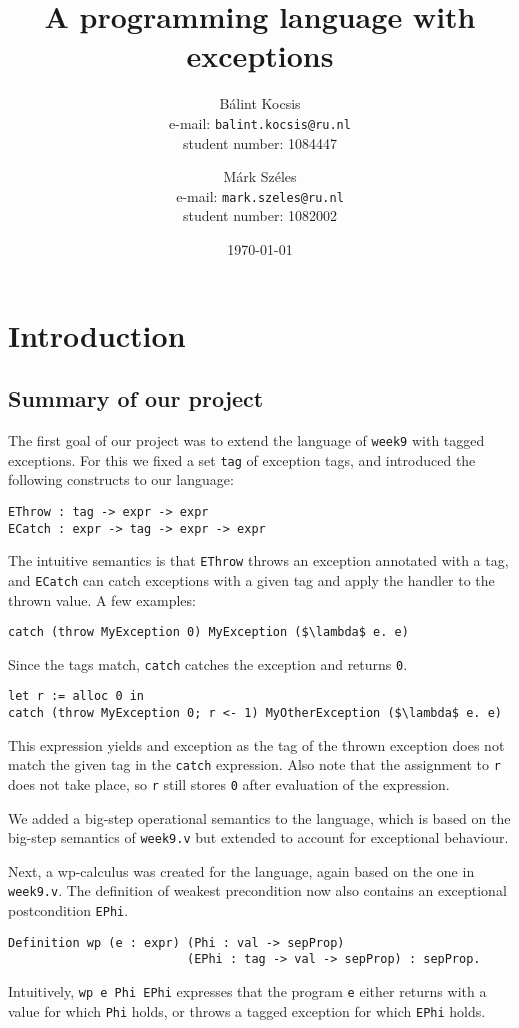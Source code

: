 \documentclass{article}
\title{A programming language with exceptions}
\author{Bálint Kocsis \\ e-mail: \texttt{balint.kocsis@ru.nl} \\ student number: 1084447
\and
Márk Széles \\ e-mail: \texttt{mark.szeles@ru.nl} \\ student number: 1082002}
\date{\today}
\begin{document}
\maketitle

\section{Introduction}

\subsection{Summary of our project}

The first goal of our project was to extend the language of \texttt{week9} with tagged exceptions. For this we fixed a set \texttt{tag} of
exception tags, and introduced the following constructs to our language:
\begin{lstlisting}
EThrow : tag -> expr -> expr
ECatch : expr -> tag -> expr -> expr
\end{lstlisting}
The intuitive semantics is that \texttt{EThrow} throws an exception annotated with a tag, and \texttt{ECatch} can catch exceptions with a
given tag and apply the handler to the thrown value. A few examples:
\begin{lstlisting}[mathescape]
catch (throw MyException 0) MyException ($\lambda$ e. e)
\end{lstlisting}
Since the tags match, \texttt{catch} catches the exception and returns \texttt{0}.
\begin{lstlisting}[mathescape]
let r := alloc 0 in
catch (throw MyException 0; r <- 1) MyOtherException ($\lambda$ e. e)
\end{lstlisting}
This expression yields and exception as the tag of the thrown exception does not match the given tag in the \texttt{catch} expression.
Also note that the assignment to \texttt{r} does not take place, so \texttt{r} still stores \texttt{0} after evaluation of the expression.

We added a big-step operational semantics to the language, which is based on the big-step semantics of \texttt{week9.v} but extended
to account for exceptional behaviour.

Next, a wp-calculus was created for the language, again based on the one in \texttt{week9.v}. The definition of weakest precondition now
also contains an exceptional postcondition \texttt{EPhi}.
\begin{lstlisting}
Definition wp (e : expr) (Phi : val -> sepProp)
                         (EPhi : tag -> val -> sepProp) : sepProp.
\end{lstlisting}
Intuitively, \texttt{wp e Phi EPhi} expresses that the program \texttt{e} either returns with a value for which \texttt{Phi} holds, or throws a
tagged exception for which \texttt{EPhi} holds.
\end{document}

